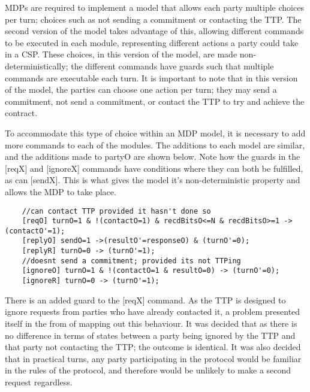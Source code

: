\documentclass{l4proj}
\begin{document}
MDPs are required to implement a model that allows each party multiple choices per turn; choices such as not sending a commitment or contacting the TTP. The second version of the model takes advantage of this, allowing different commands to be executed in each module, representing different actions a party could take in a CSP. These choices, in this version of the model, are made non-deterministically; the different commands have guards such that multiple commands are executable each turn. It is important to note that in this version of the model, the parties can choose one action per turn; they may send a commitment, not send a commitment, or contact the TTP to try and achieve the contract.

To accommodate this type of choice within an MDP model, it is necessary to add more commands to each of the modules. The additions to each model are similar, and the additions made to partyO are shown below. Note how the guards in the [reqX] and [ignoreX] commands have conditions where they can both be fulfilled, as can [sendX]. This is what gives the model it's non-deterministic property and allows the MDP to take place.

\begin{lstlisting}
    //can contact TTP provided it hasn't done so
    [reqO] turnO=1 & !(contactO=1) & recdBitsO<=N & recdBitsO>=1 -> (contactO'=1);
    [replyO] sendO=1 ->(resultO'=responseO) & (turnO'=0);
    [replyR] turnO=0 -> (turnO'=1);
    //doesnt send a commitment; provided its not TTPing
    [ignoreO] turnO=1 & !(contactO=1 & resultO=0) -> (turnO'=0);
	[ignoreR] turnO=0 -> (turnO'=1);
\end{lstlisting}

There is an added guard to the [reqX] command. As the TTP is designed to ignore requests from parties who have already contacted it, a problem presented itself in the from of mapping out this behaviour. It was decided that as there is no difference in terms of states between a party being ignored by the TTP and that party not contacting the TTP; the outcome is identical. It was also decided that in practical turns, any party participating in the protocol would be familiar in the rules of the protocol, and therefore would be unlikely to make a second request regardless.\\
\end{document}

